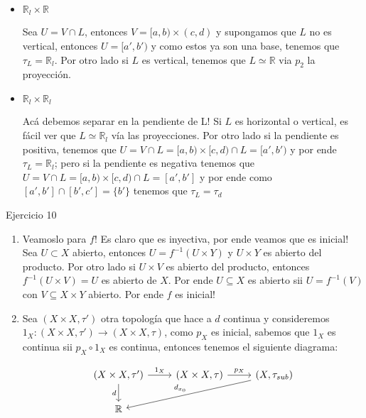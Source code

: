 \documentclass[11pt]{article}
\newcommand{\R}{{\mathbb{R}}}
\newcommand{\sett}[1]{\{#1\}}
\newenvironment{proof}[1][Demostraci\'on]{\begin{trivlist}
\item[\hskip \labelsep {\bfseries #1}]}{\end{trivlist}}
\newcommand{\qed}{\nobreak \ifvmode \relax \else
      \ifdim\lastskip<1.5em \hskip-\lastskip
      \hskip1.5em plus0em minus0.5em \fi \nobreak
      \vrule height0.75em width0.5em depth0.25em\fi}
\begin{document}
\begin{enumerate}
\begin{proof}

\begin{itemize}

\item {$\R_l \times \R$}

Sea $U = V \cap L$, entonces $V = [a,b) \times (c,d)$ y supongamos que $L$ no es vertical, entonces $U = [a',b')$ y como estos ya son una base, tenemos que $\tau_L = \R_l$. Por otro lado si $L$ es vertical, tenemos que $L \simeq \R$ via $p_2$ la proyecci\'on.

\item {$\R_l \times \R_l$}

Ac\'a debemos separar en la pendiente de L! Si $L$ es horizontal o vertical, es f\'acil ver que $L \simeq \R_l$ v\'ia las proyecciones. Por otro lado si la pendiente es positiva, tenemos que $U = V \cap L = [a,b) \times [c,d) \cap L = [a',b')$ y por ende $\tau_L = \R_l$; pero si la pendiente es negativa tenemos que $U = V \cap L = [a,b) \times [c,d) \cap L = [a',b']$ y por ende como $[a',b'] \cap [b',c'] = \sett{b'}$ tenemos que $\tau_L = \tau_d$ \qed

\end{itemize}

\end{proof}

\item {Ejercicio 10}

\begin{proof}

\begin{enumerate}

\item Veamoslo para $f$! Es claro que es inyectiva, por ende veamos que es inicial! Sea $U \subset X$ abierto, entonces $U = f^{-1}(U \times Y)$ y $U \times Y$ es abierto del producto. Por otro lado si $U \times V$ es abierto del producto, entonces $f^{-1}(U \times V)=U$ es abierto de $X$. Por ende $U \subseteq X$ es abierto sii $U = f^{-1}(V)$ con $V \subseteq X \times Y$ abierto. Por ende $f$ es inicial!

\item Sea $(X \times X, \tau')$ otra topolog\'ia que hace a $d$ continua y consideremos $1_X : (X \times X , \tau') \rightarrow (X \times X , \tau)$, como $p_X$ es inicial, sabemos que $1_X$ es continua sii $p_X \circ 1_X$ es continua, entonces tenemos el siguiente diagrama:

\[
\begin{tikzcd}
(X \times X , \tau') \arrow{r}{1_X} \arrow[swap]{d}{d} & (X \times X , \tau) \arrow{r}{p_X} & (X, \tau_{sub}) \arrow[swap]{dll}{d_{x_0}} \\
\R \\
\end{tikzcd}
\]


\end{enumerate}
\end{proof}
\end{enumerate}
\end{document}
